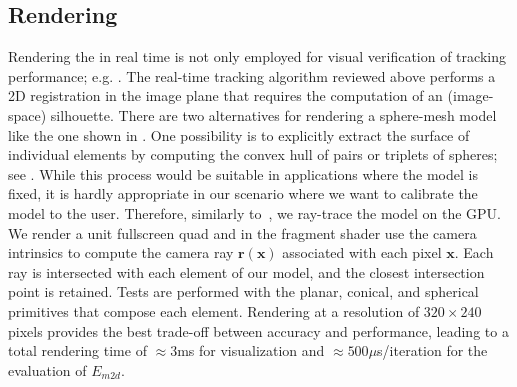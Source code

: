 \subsection{Rendering}
\label{sec:rendering}
Rendering the  in real time is not only employed for visual verification of tracking performance; e.g. . The real-time tracking algorithm reviewed above performs a 2D registration in the image plane that requires the computation of an (image-space) silhouette. There are two alternatives for rendering a sphere-mesh model like the one shown in . One possibility is to explicitly extract the surface of individual elements by computing the convex hull of pairs or triplets of spheres; see .
While this process would be suitable in applications where the model is fixed, it is hardly appropriate in our scenario where we want to calibrate the model to the user. Therefore, similarly to~\cite{thiery2016spheremesh}, we ray-trace the model on the GPU. We render a unit fullscreen quad and in the fragment shader use the camera intrinsics to compute the camera ray $\mathbf{r}(\mathbf{x})$ associated with each pixel $\mathbf{x}$. Each ray is intersected with each element of our model, and the closest intersection point is retained. Tests are performed with the planar, conical, and spherical primitives that compose each element. 
% 
% 
Rendering at a resolution of $320 \times 240$ pixels provides the best trade-off between accuracy and performance, leading to a total rendering time of $\approx 3$ms for visualization and $\approx 500 \mu$s/iteration for the evaluation of $E_{m2d}$.

\endinput


